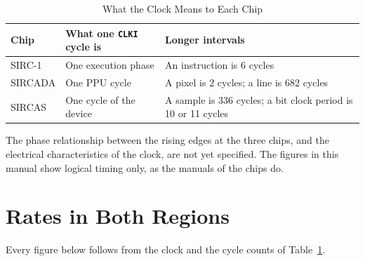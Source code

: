 \begin{table}[H]
	\centering
	\begin{tabular}{llp{6.6cm}}
		\toprule
		\textbf{Chip} & \textbf{What one \texttt{CLKI} cycle is} & \textbf{Longer intervals}                                     \\
		\midrule
		SIRC-1        & One execution phase                      & An instruction is 6 cycles                                    \\
		SIRCADA       & One PPU cycle                            & A pixel is 2 cycles; a line is 682 cycles                     \\
		SIRCAS        & One cycle of the device                  & A sample is 336 cycles; a bit clock period is 10 or 11 cycles \\
		\bottomrule
	\end{tabular}
	\caption{What the Clock Means to Each Chip}
	\label{tab:clock-meaning}
\end{table}

The phase relationship between the rising edges at the three chips, and the electrical characteristics of the clock,
are not yet specified. The figures in this manual show logical timing only, as the manuals of the chips do.

\section{Rates in Both Regions}
\label{sec:rates}

Every figure below follows from the clock and the cycle counts of Table~\ref{tab:clock-meaning}.

